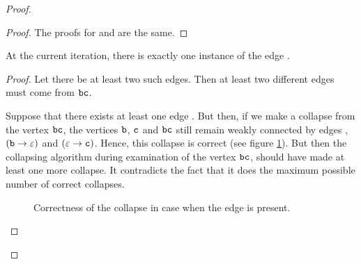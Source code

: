 \begin{proof}
\begin{proof}
The proofs for  and  are the same.
\end{proof}

\begin{lemma}
\label{lem:bbcone}
At the current iteration, there is exactly one instance of the edge .
\end{lemma}
\begin{proof}
Let there be at least two such edges. Then at least two different edges must come from $ {\tt bc} $.

Suppose that there exists at least one edge . But then, if we make a collapse from the vertex $ {\tt bc} $, the vertices $ {\tt b} $, $ {\tt c} $ and $ {\tt bc} $ still remain weakly connected by edges , $ ({\tt b} \to \varepsilon) $ and $ (\varepsilon \to {\tt c}) $. Hence, this collapse is correct (see figure \ref{fig:lvl1lemmabcc}). But then the collapsing algorithm during examination of the vertex $ {\tt bc} $, should have made at least one more collapse. It contradicts the fact that it does the maximum possible number of correct collapses.

\begin{figure}[ht]
\begin{center}

\end{center}

\caption{Correctness of the collapse in case when the edge  is present.}\label{fig:lvl1lemmabcc}
\end{figure}


\end{proof}
\end{proof}
